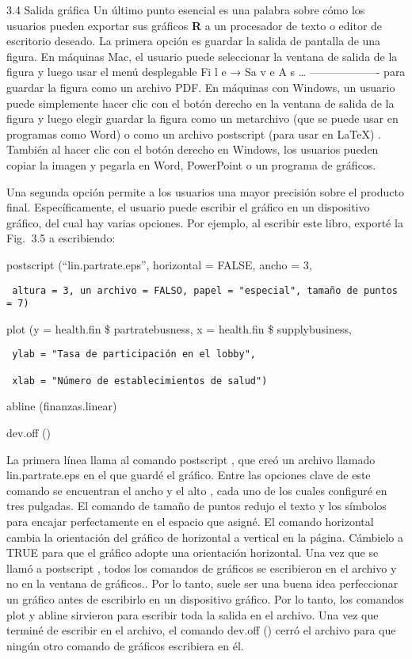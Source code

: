 \documentclass[
]{book}
\begin{document}
3.4 Salida gráfica
Un último punto esencial es una palabra sobre cómo los usuarios pueden exportar sus gráficos \textbf{R} a un procesador de texto o editor de escritorio deseado. La primera opción es guardar la salida de pantalla de una figura. En máquinas Mac, el usuario puede seleccionar la ventana de salida de la figura y luego usar el menú desplegable Fi l e → Sa v e A s \ldots{} ------------------- para guardar la figura como un archivo PDF. En máquinas con Windows, un usuario puede simplemente hacer clic con el botón derecho en la ventana de salida de la figura y luego elegir guardar la figura como un metarchivo (que se puede usar en programas como Word) o como un archivo postscript (para usar en LaTeX) . También al hacer clic con el botón derecho en Windows, los usuarios pueden copiar la imagen y pegarla en Word, PowerPoint o un programa de gráficos.

Una segunda opción permite a los usuarios una mayor precisión sobre el producto final. Específicamente, el usuario puede escribir el gráfico en un dispositivo gráfico, del cual hay varias opciones. Por ejemplo, al escribir este libro, exporté la Fig.  3.5 a escribiendo:

postscript (``lin.partrate.eps'', horizontal = FALSE, ancho = 3,

\begin{verbatim}
 altura = 3, un archivo = FALSO, papel = "especial", tamaño de puntos = 7)
\end{verbatim}

plot (y = health.fin \$ partratebusness, x = health.fin \$ supplybusiness,

\begin{verbatim}
 ylab = "Tasa de participación en el lobby",

 xlab = "Número de establecimientos de salud")
\end{verbatim}

abline (finanzas.linear)

dev.off ()

La primera línea llama al comando postscript , que creó un archivo llamado lin.partrate.eps en el que guardé el gráfico. Entre las opciones clave de este comando se encuentran el ancho y el alto , cada uno de los cuales configuré en tres pulgadas. El comando de tamaño de puntos redujo el texto y los símbolos para encajar perfectamente en el espacio que asigné. El comando horizontal cambia la orientación del gráfico de horizontal a vertical en la página. Cámbielo a TRUE para que el gráfico adopte una orientación horizontal. Una vez que se llamó a postscript , todos los comandos de gráficos se escribieron en el archivo y no en la ventana de gráficos.. Por lo tanto, suele ser una buena idea perfeccionar un gráfico antes de escribirlo en un dispositivo gráfico. Por lo tanto, los comandos plot y abline sirvieron para escribir toda la salida en el archivo. Una vez que terminé de escribir en el archivo, el comando dev.off () cerró el archivo para que ningún otro comando de gráficos escribiera en él.
\end{document}
